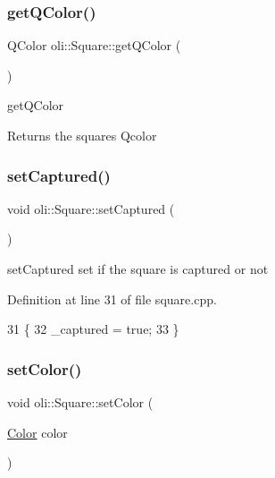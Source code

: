 \subsubsection{\texorpdfstring{get\+Q\+Color()}{getQColor()}}
{\footnotesize\ttfamily Q\+Color oli\+::\+Square\+::get\+Q\+Color (\begin{DoxyParamCaption}{ }\end{DoxyParamCaption})}



get\+Q\+Color 

\begin{DoxyReturn}{Returns}
the square\textquotesingle{}s Qcolor 
\end{DoxyReturn}
\hypertarget{classoli_1_1_square_a1c2449cd8855586cd63d6bde60873ce5}{}\label{classoli_1_1_square_a1c2449cd8855586cd63d6bde60873ce5} 
\subsubsection{\texorpdfstring{set\+Captured()}{setCaptured()}}
{\footnotesize\ttfamily void oli\+::\+Square\+::set\+Captured (\begin{DoxyParamCaption}{ }\end{DoxyParamCaption})}



set\+Captured set if the square is captured or not 



Definition at line 31 of file square.\+cpp.


\begin{DoxyCode}
31                         \{
32     \_captured = \textcolor{keyword}{true};
33 \}
\end{DoxyCode}
\hypertarget{classoli_1_1_square_afd04e5d1eaa2e2f2eaab0be32f2d965f}{}\label{classoli_1_1_square_afd04e5d1eaa2e2f2eaab0be32f2d965f} 
\subsubsection{\texorpdfstring{set\+Color()}{setColor()}}
{\footnotesize\ttfamily void oli\+::\+Square\+::set\+Color (\begin{DoxyParamCaption}\item[{\hyperlink{namespaceoli_aac44697e43b3ab2ad32fe892ab2276eb}{Color}}]{color }\end{DoxyParamCaption})}



